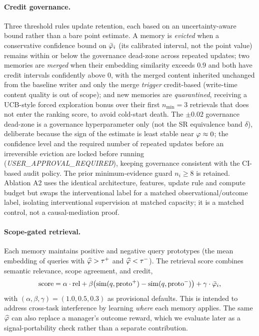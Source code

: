 \paragraph{Credit governance.}
Three threshold rules update retention, each based on an uncertainty-aware bound
rather than a bare point estimate. A memory is \emph{evicted} when a conservative
confidence bound on $\bar{\varphi}_i$ (its calibrated interval, not the point value)
remains within or below the governance dead-zone across repeated updates; two
memories are \emph{merged} when their embedding similarity exceeds $0.9$ and both
have credit intervals confidently above $0$, with the merged content inherited
unchanged from the baseline writer and only the merge \emph{trigger} credit-based
(write-time content quality is out of scope); and new memories are
\emph{quarantined}, receiving a UCB-style forced exploration bonus over their first
$n_{\min} = 3$ retrievals that does not enter the
ranking score, to avoid cold-start death. The $\pm 0.02$ governance dead-zone is a
governance hyperparameter only (not the SR equivalence band $\delta$), deliberate
because the sign of the estimate is least stable near $\varphi \approx 0$; the
confidence level and the required number of repeated updates before an irreversible
eviction are locked before running (\emph{USER\_APPROVAL\_REQUIRED}), keeping
governance consistent with the CI-based audit policy. The prior minimum-evidence
guard $n_i \ge 8$ is retained. Ablation
A2 uses the identical \aca{} architecture, features, update rule and compute budget
but swaps the interventional label for a matched observational/outcome label,
isolating interventional supervision at matched capacity; it is a matched control,
not a causal-mediation proof.

\paragraph{Scope-gated retrieval.}
Each memory maintains positive and negative query prototypes (the mean embedding
of queries with $\widehat{\varphi} > \tau^{+}$ and $\widehat{\varphi} < \tau^{-}$). The retrieval score
combines semantic relevance, scope agreement, and credit,
\begin{equation}
\text{score} = \alpha\cdot\text{rel} + \beta\big(\mathrm{sim}(q,\text{proto}^{+})
  - \mathrm{sim}(q,\text{proto}^{-})\big) + \gamma\cdot\bar{\varphi}_i,
\end{equation}
with $(\alpha,\beta,\gamma) = (1.0, 0.5, 0.3)$ as provisional defaults. This is
intended to address cross-task interference by learning \emph{where} each memory
applies. The same $\widehat{\varphi}$ can also replace a manager's outcome reward, which we
evaluate later as a signal-portability check rather than a separate contribution.

